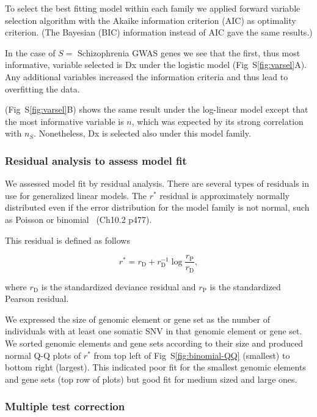 \documentclass[letterpaper]{article}
\begin{document}
To select the best fitting model within each family we applied forward
variable selection algorithm with the Akaike information criterion (AIC) as
optimality criterion.  (The Bayesian (BIC) information instead of AIC gave the
same results.)

In the case of \(S =\) Schizophrenia GWAS genes we see that the first,
thus most informative, variable selected is Dx under the logistic model
(Fig~S\ref{fig:varsel}A).
Any additional variables increased the information criteria and thus lead to
overfitting the data.

(Fig~S\ref{fig:varsel}B) shows the same result under the log-linear model except that the
most informative variable is \(n\), which was expected by its
strong correlation with \(n_S\).  Nonetheless, Dx is selected also under this
model family.

\subsubsection*{Residual analysis to assess model fit }

We assessed model fit by residual analysis.  There are several types of residuals in use for generalized linear models.
The $r^\ast$ residual is approximately normally distributed even if the error
distribution for the model family is not normal, such as Poisson or
binomial~\citep{davison2003statistical} (Ch10.2 p477).

This residual is defined as follows

$$
r^\ast = r_\mathrm{D} + r_\mathrm{D}^{-1} \log
\frac{r_\mathrm{P}}{r_\mathrm{D}},
$$

where \(r_\mathrm{D}\) is the standardized deviance residual and
\(r_\mathrm{P}\) is the standardized Pearson residual.

We expressed the size of genomic element or gene set as the number of
individuals with at least one somatic SNV in that genomic element or gene set.
We sorted genomic elements and gene sets according to their size and produced
normal Q-Q plots of \(r^\ast\) from top left of Fig~S\ref{fig:binomial-QQ} (smallest) to
bottom right (largest).  This indicated poor fit for the smallest genomic
elements and gene sets (top row of plots) but good fit for medium sized and
large ones.

\subsubsection*{Multiple test correction}
\end{document}

